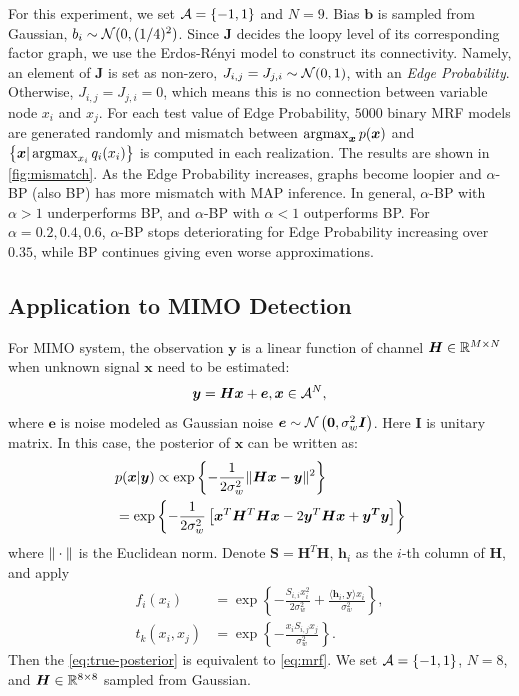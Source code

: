 \documentclass[conference]{IEEEtran}
\begin{document}
For this experiment, we set $\mathcal{A} = \left\{ -1, 1 \right\}$ and $N=9$. Bias $\bm{b}$ is sampled from Gaussian, ${b_i} \sim \mathcal{N}(0, (1/4)^2)$. Since $\bm{J}$ decides the loopy level of its corresponding factor graph, we use the Erdos-Rényi model \cite{erdos1960} to construct its connectivity. Namely, an element of $\bm{J}$ is set as non-zero, $ {J}_{i,j} = {J}_{j,i} \sim \mathcal{N}(0,1)$, with an \textit{Edge Probability}. Otherwise, ${J}_{i, j} = {J}_{j,i} = 0$, which means this is no connection between variable node $x_i$ and $x_j$. For each test value of Edge Probability, $5000$ binary MRF models are generated randomly and mismatch between $\operatorname{argmax}_{\bm{x}} p(\bm{x})$ and $\left\{ \bm{x}|\operatorname{argmax}_{x_i}q_i(x_i) \right\}$ is computed in each realization. The results are shown in \autoref{fig:mismatch}. As the Edge Probability increases, graphs become loopier and $\alpha$-BP (also BP) has more mismatch with MAP inference. In general, $\alpha$-BP with $\alpha > 1$ underperforms BP, and $\alpha$-BP with $\alpha < 1$ outperforms BP. For $\alpha=0.2, 0.4, 0.6$, $\alpha$-BP stops deteriorating for Edge Probability increasing over $0.35$, while BP continues giving even worse approximations.


\subsection{Application to MIMO Detection}

For MIMO system, the observation $\bm{y}$ is a linear function of channel $\bm{H}\in \mathbb{R}^{M\times N}$ when unknown signal $\bm{x}$ need to be estimated:
\begin{equation}\label{eq:linear-model}
  \bm{y} = \bm{H} \bm{x} + \bm{e}, \bm{x} \in \mathcal{A}^N,
\end{equation}
where $\bm{e}$ is  noise modeled as Gaussian noise $ \bm{e} \sim \mathcal{N}\left( \bm{0}, \sigma^2_{w} \bm{I} \right)$. Here $\bm{I}$ is unitary matrix. In this case, the posterior of $\bm{x}$ can be written as:
\begin{align}\label{eq:true-posterior}
  &p(\bm{x}|\bm{y}) \propto \exp\left\{ - \frac{1}{2\sigma_w^2} \| \bm{Hx} - \bm{y} \|^2 \right\} \nonumber \\
  & = \exp\left\{ - \frac{1}{2\sigma_w^2}\left[ \bm{x}^{T}\bm{H}^{T}\bm{H}\bm{x} - 2 \bm{y}^T\bm{H}\bm{x}  + \bm{y^T}\bm{y}  \right] \right\}
\end{align}
where $\| \cdot \|$ is the Euclidean norm. Denote $\bm{S} = \bm{H}^T\bm{H}$, $\bm{h}_i$ as the $i$-th column of $\bm{H}$, and apply
\begin{align}
  f_{{i}}(x_i) &= \exp\left\{- \frac{S_{i,i} x_i^2}{2 \sigma_w^2} + \frac{\langle {\bm{h}_i, \bm{y}}\rangle x_i}{\sigma_w^2} \right\}, \\
  t_{{k}}(x_i, x_j) &= \exp\left\{ -\frac{x_i S_{i,j} x_j}{\sigma_w^2} \right\}.
\end{align}
Then the \autoref{eq:true-posterior} is equivalent to \autoref{eq:mrf}. We set $\mathcal{A} = \left\{ -1, 1 \right\}$, $N = 8$, and $\bm{H}\in \mathbb{R}^{8 \times 8}$ sampled from Gaussian.
\end{document}
